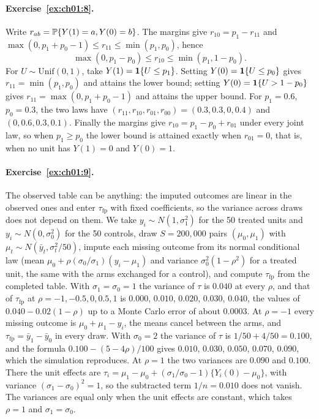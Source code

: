 \paragraph{Exercise~\ref{ex:ch01:8}.} Write $r_{ab}=\mathbb{P}\{Y(1)=a,Y(0)=b\}$. The margins give $r_{10}=p_1-r_{11}$ and $\max(0,p_1+p_0-1)\le r_{11}\le\min(p_1,p_0)$, hence
\[
\max(0,p_1-p_0)\le r_{10}\le\min(p_1,1-p_0).
\]
For $U\sim\mathrm{Unif}(0,1)$, take $Y(1)=\mathbf{1}\{U\le p_1\}$. Setting $Y(0)=\mathbf{1}\{U\le p_0\}$ gives $r_{11}=\min(p_1,p_0)$ and attains the lower bound; setting $Y(0)=\mathbf{1}\{U>1-p_0\}$ gives $r_{11}=\max(0,p_1+p_0-1)$ and attains the upper bound. For $p_1=0.6$, $p_0=0.3$, the two laws have $(r_{11},r_{10},r_{01},r_{00})=(0.3,0.3,0,0.4)$ and $(0,0.6,0.3,0.1)$. Finally the margins give $r_{10}=p_1-p_0+r_{01}$ under every joint law, so when $p_1\ge p_0$ the lower bound is attained exactly when $r_{01}=0$, that is, when no unit has $Y(1)=0$ and $Y(0)=1$.

\paragraph{Exercise~\ref{ex:ch01:9}.} The observed table can be anything: the imputed outcomes are linear in the observed ones and enter $\tau_{\mathrm{fp}}$ with fixed coefficients, so the variance across draws does not depend on them. We take $y_i \sim N(1, \sigma_1^2)$ for the 50 treated units and $y_i \sim N(0, \sigma_0^2)$ for the 50 controls, draw $S = 200{,}000$ pairs $(\mu_0, \mu_1)$ with $\mu_t \sim N(\bar y_t, \sigma_t^2/50)$, impute each missing outcome from its normal conditional law (mean $\mu_0 + \rho(\sigma_0/\sigma_1)(y_i - \mu_1)$ and variance $\sigma_0^2(1 - \rho^2)$ for a treated unit, the same with the arms exchanged for a control), and compute $\tau_{\mathrm{fp}}$ from the completed table. With $\sigma_1 = \sigma_0 = 1$ the variance of $\tau$ is $0.040$ at every $\rho$, and that of $\tau_{\mathrm{fp}}$ at $\rho = -1, -0.5, 0, 0.5, 1$ is $0.000$, $0.010$, $0.020$, $0.030$, $0.040$, the values of $0.040 - 0.02(1 - \rho)$ up to a Monte Carlo error of about $0.0003$. At $\rho = -1$ every missing outcome is $\mu_0 + \mu_1 - y_i$, the means cancel between the arms, and $\tau_{\mathrm{fp}} = \bar y_1 - \bar y_0$ in every draw. With $\sigma_0 = 2$ the variance of $\tau$ is $1/50 + 4/50 = 0.100$, and the formula $0.100 - (5 - 4\rho)/100$ gives $0.010$, $0.030$, $0.050$, $0.070$, $0.090$, which the simulation reproduces. At $\rho = 1$ the two variances are $0.090$ and $0.100$. There the unit effects are $\tau_i = \mu_1 - \mu_0 + (\sigma_1/\sigma_0 - 1)\{Y_i(0) - \mu_0\}$, with variance $(\sigma_1 - \sigma_0)^2 = 1$, so the subtracted term $1/n = 0.010$ does not vanish. The variances are equal only when the unit effects are constant, which takes $\rho = 1$ and $\sigma_1 = \sigma_0$.

